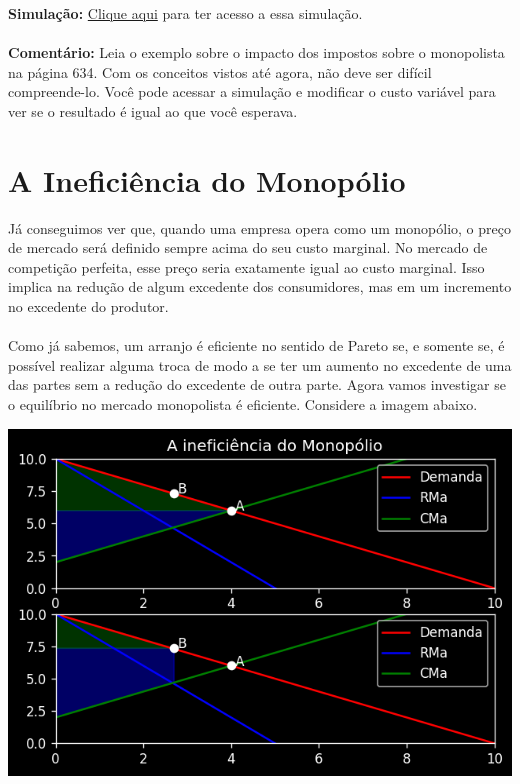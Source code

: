 \documentclass[a4paper,11pt,oneside]{book}
\theoremstyle{definition}
\theoremstyle{break}
\begin{document}
\textbf{Simulação:} \href{https://colab.research.google.com/drive/1MRJb9DZ7n_Hz2Kp9ng8K7pOcb1DTy_u5?usp=sharing}{Clique aqui} para ter acesso a essa simulação.
\\
\\
\textbf{Comentário:} Leia o exemplo sobre o impacto dos impostos sobre o monopolista na página 634. Com os conceitos vistos até agora, não deve ser difícil compreende-lo. Você pode acessar a simulação e modificar o custo variável para ver se o resultado é igual ao que você esperava.

\section{A Ineficiência do Monopólio}

Já conseguimos ver que, quando uma empresa opera como um monopólio, o preço de mercado será definido sempre acima do seu custo marginal. No mercado de competição perfeita, esse preço seria exatamente igual ao custo marginal. Isso implica na redução de algum excedente dos consumidores, mas em um incremento no excedente do produtor.
\\
\\
Como já sabemos, um arranjo é eficiente no sentido de Pareto se, e somente se, é possível realizar alguma troca de modo a se ter um aumento no excedente de uma das partes sem a redução do excedente de outra parte. Agora vamos investigar se o equilíbrio no mercado monopolista é eficiente. Considere a imagem abaixo.

\begin{center}
\includegraphics[scale=0.8]{cap25_4-inef_monopolio.png}
\end{center}
\end{document}
